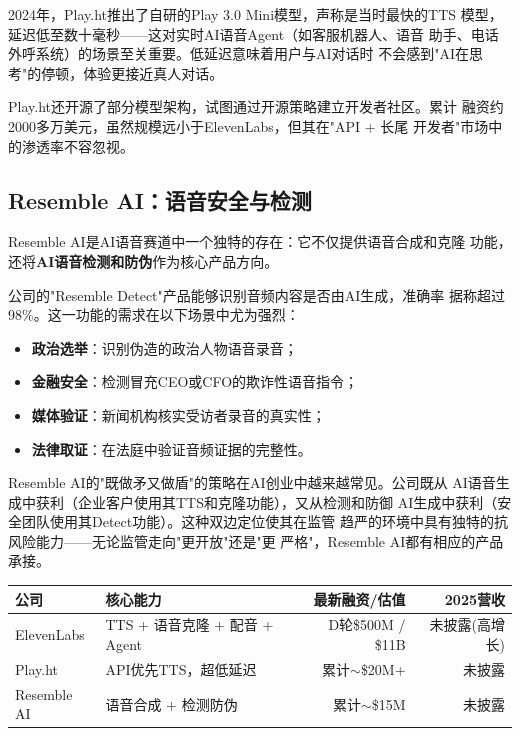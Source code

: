 2024年，Play.ht推出了自研的Play 3.0 Mini模型，声称是当时最快的TTS
模型，延迟低至数十毫秒——这对实时AI语音Agent（如客服机器人、语音
助手、电话外呼系统）的场景至关重要。低延迟意味着用户与AI对话时
不会感到"AI在思考"的停顿，体验更接近真人对话。

Play.ht还开源了部分模型架构，试图通过开源策略建立开发者社区。累计
融资约2000多万美元，虽然规模远小于ElevenLabs，但其在"API + 长尾
开发者"市场中的渗透率不容忽视。

\subsection{Resemble AI：语音安全与检测}
\label{subsec:resembleai}

Resemble AI是AI语音赛道中一个独特的存在：它不仅提供语音合成和克隆
功能，还将\textbf{AI语音检测和防伪}作为核心产品方向。

公司的"Resemble Detect"产品能够识别音频内容是否由AI生成，准确率
据称超过98\%。这一功能的需求在以下场景中尤为强烈：
\begin{itemize}
  \item \textbf{政治选举}：识别伪造的政治人物语音录音；
  \item \textbf{金融安全}：检测冒充CEO或CFO的欺诈性语音指令；
  \item \textbf{媒体验证}：新闻机构核实受访者录音的真实性；
  \item \textbf{法律取证}：在法庭中验证音频证据的完整性。
\end{itemize}

Resemble AI的"既做矛又做盾"的策略在AI创业中越来越常见。公司既从
AI语音生成中获利（企业客户使用其TTS和克隆功能），又从检测和防御
AI生成中获利（安全团队使用其Detect功能）。这种双边定位使其在监管
趋严的环境中具有独特的抗风险能力——无论监管走向"更开放"还是"更
严格"，Resemble AI都有相应的产品承接。

\begin{keybox}
\small
\begin{tabularx}{\textwidth}{l X r r}
\toprule
\rowcolor{figLightGray}
\textbf{公司} & \textbf{核心能力} & \textbf{最新融资/估值} & \textbf{2025营收} \\
\midrule
ElevenLabs   & TTS + 语音克隆 + 配音 + Agent  & D轮\$500M / \$11B  & 未披露(高增长) \\
Play.ht      & API优先TTS，超低延迟            & 累计$\sim$\$20M+   & 未披露 \\
Resemble AI  & 语音合成 + 检测防伪             & 累计$\sim$\$15M    & 未披露 \\
\bottomrule
\end{tabularx}
\end{keybox}

